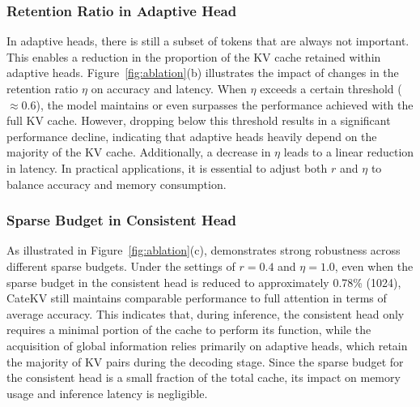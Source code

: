 
\subsubsection{Retention Ratio in Adaptive Head}
In adaptive heads, there is still a subset of tokens that are always not important.
This enables a reduction in the proportion of the KV cache retained within adaptive heads. Figure~\ref{fig:ablation}(b) illustrates the impact of changes in the retention ratio $\eta$ on accuracy and latency.
When $\eta$ exceeds a certain threshold ($\approx$0.6), the model maintains or even surpasses the performance achieved with the full KV cache. 
However, dropping below this threshold results in a significant performance decline, indicating that adaptive heads heavily depend on the majority of the KV cache. Additionally, a decrease in $\eta$ leads to a linear reduction in latency.
In practical applications, it is essential to adjust both $r$ and $\eta$ to balance accuracy and memory consumption.

\subsubsection{Sparse Budget in Consistent Head}

As illustrated in Figure~\ref{fig:ablation}(c), \shortname demonstrates strong robustness across different sparse budgets. Under the settings of $r=0.4$ and $\eta=1.0$, even when the sparse budget in the consistent head is reduced to approximately 0.78\% (1024), CateKV still maintains comparable performance to full attention in terms of average accuracy. 
 This indicates that, during inference, the consistent head only requires a minimal portion of the cache to perform its function, while the acquisition of global information relies primarily on adaptive heads, which retain the majority of KV pairs during the decoding stage. Since the sparse budget for the consistent head is a small fraction of the total cache, its impact on memory usage and inference latency is negligible.


